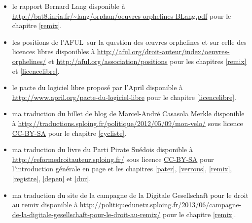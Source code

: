 \begin{itemize}
\item le rapport Bernard Lang  disponible à \url{http://bat8.inria.fr/~lang/orphan/oeuvres-orphelines-BLang.pdf} pour le chapitre \ref{remix}.
\item les positions de l'AFUL sur la question des œuvres orphelines et sur celle des licences libres disponibles à \url{http://aful.org/droit-auteur/index/oeuvres-orphelines/} et \url{http://aful.org/association/positions} pour les chapitres \ref{remix} et \ref{licencelibre}.
\item le pacte du logiciel libre proposé par l'April disponible à \url{http://www.april.org/pacte-du-logiciel-libre} pour le chapitre \ref{licencelibre}.
\item ma traduction du billet de blog  de Marcel-André Casasola Merkle disponible à \url{http://traductions.sploing.fr/politique/2012/05/09/mon-velo/} sous licence \href{http://creativecommons.org/licenses/by-sa/2.0/fr/}{CC-BY-SA} pour le chapitre \ref{cycliste}.
\item ma traduction du livre du Parti Pirate Suédois  disponible à \url{http://reformedroitauteur.sploing.fr/} sous licence \href{http://creativecommons.org/licenses/by-sa/2.0/fr/}{CC-BY-SA} pour l'introduction générale en page \pageref{premintro} et les chapitres \ref{pater}, \ref{verrous}, \ref{remix}, \ref{registre}, \ref{depen} et \ref{dur}. 
\item ma traduction du site de la campagne de la Digitale Gesellschaft pour le droit au remix disponible à \url{http://politiquedunetz.sploing.fr/2013/06/campagne-de-la-digitale-gesellschaft-pour-le-droit-au-remix/} pour le chapitre \ref{remix}.
\end{itemize}

\nocite{lessig2004culture}
\nocite{florent2004bon}
\nocite{benkler2009richesse}
\nocite{benkler2009richesse}
\nocite{manach2010vie}
\nocite{lessig2005avenir}
\nocite{raymond1998cathedrale}
\nocite{stallman2010richard}
\nocite{sagot2002propriete}
\nocite{perline2004bataille}
\nocite{aigrain2008internet}
\nocite{hadopi}
\nocite{opendata}
\nocite{smiers2011monde}

